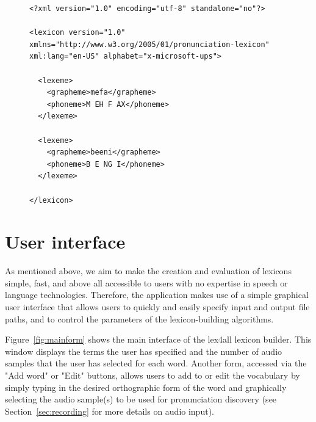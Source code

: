 \documentclass[11pt]{article}
\begin{document}
\begin{figure}
\begin{lstlisting}[caption=TODO: MORE PRONUNCIATIONS Sample lexicon file mapping Yoruba words to American English pronunciations., label=lst:lexicon]
<?xml version="1.0" encoding="utf-8" standalone="no"?>
	  
<lexicon version="1.0" xmlns="http://www.w3.org/2005/01/pronunciation-lexicon" xml:lang="en-US" alphabet="x-microsoft-ups">
		 
  <lexeme>
    <grapheme>mefa</grapheme>
    <phoneme>M EH F AX</phoneme>
  </lexeme>
  
  <lexeme>
    <grapheme>beeni</grapheme>
    <phoneme>B E NG I</phoneme>
  </lexeme>
  
</lexicon>
\end{lstlisting}
\end{figure}







\section{User interface}
\label{sec:frontend}

As mentioned above, we aim to make the creation and evaluation of lexicons simple, fast, and above all accessible to users with no expertise in speech or language technologies. Therefore, the application makes use of a simple graphical user interface that allows users to quickly and easily specify input and output file paths, and to control the parameters of the lexicon-building algorithms. 

Figure~\ref{fig:mainform} shows the main interface of the lex4all lexicon builder. This window displays the terms the user has specified and the number of audio samples that the user has selected for each word. Another form, accessed via the "Add word" or "Edit" buttons, allows users to add to or edit the vocabulary by simply typing in the desired orthographic form of the word and graphically selecting the audio sample(s) to be used for pronunciation discovery (see Section~\ref{sec:recording} for more details on audio input).
\end{document}
